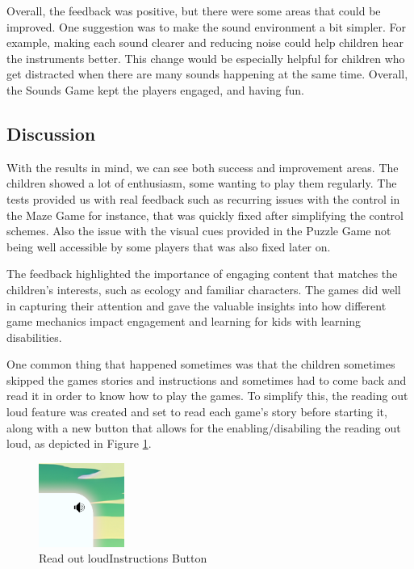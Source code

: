 Overall, the feedback was positive, but there were some areas that could be improved. One suggestion was to make the sound environment a bit simpler. For example, making each sound clearer and reducing noise could help children hear the instruments better. This change would be especially helpful for children who get distracted when there are many sounds happening at the same time. Overall, the Sounds Game kept the players engaged, and having fun.


\subsection{Discussion}

With the results in mind, we can see both success and improvement areas. The children showed a lot of enthusiasm, some wanting to play them regularly. The tests provided us with real feedback such as recurring issues with the control in the Maze Game for instance, that was quickly fixed after simplifying the control schemes. Also the issue with the visual cues provided in the Puzzle Game not being well accessible by some players that was also fixed later on.


The feedback highlighted the importance of engaging content that matches the children’s interests, such as ecology and familiar characters. The games did well in capturing their attention and gave the valuable insights into how different game mechanics impact engagement and learning for kids with learning disabilities.

One common thing that happened sometimes was that the children sometimes skipped the games stories and instructions and sometimes had to come back and read it in order to know how to play the games. To simplify this, the reading out loud feature was created and set to read each game's story before starting it, along with a new button that allows for the enabling/disabiling the reading out loud, as depicted in Figure \ref{fig:readInstructionsButton}.

\begin{figure}[!h]
    \centering
    \includegraphics[width=0.3\linewidth]{Chapters/game_changes/read-sound-icon.png}
    \caption{Read out loudInstructions Button}
    \label{fig:readInstructionsButton}
\end{figure}

